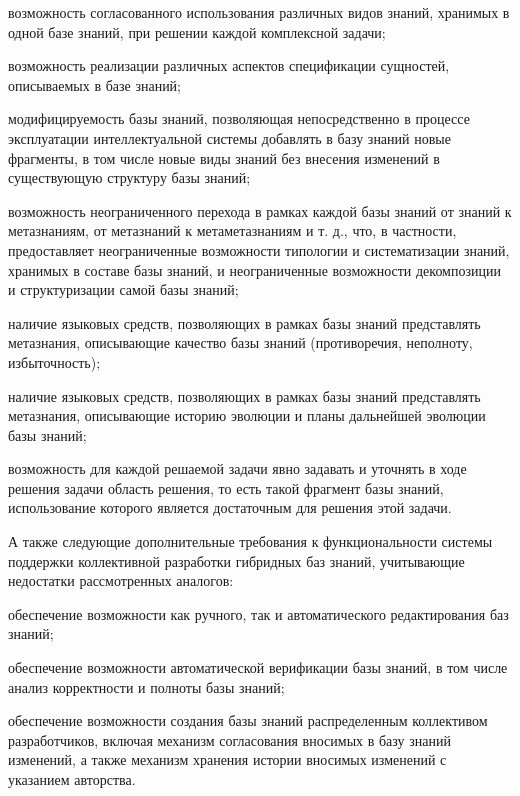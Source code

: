\begin{textitemize}
\item возможность согласованного использования различных видов знаний, хранимых в одной базе знаний, при решении каждой комплексной задачи;

\item возможность реализации различных аспектов спецификации сущностей, описываемых в базе знаний;

\item модифицируемость базы знаний, позволяющая непосредственно в процессе эксплуатации интеллектуальной системы добавлять в базу знаний новые фрагменты, в том числе новые виды знаний без внесения изменений в существующую структуру базы знаний;

\item возможность неограниченного перехода в рамках каждой базы знаний от знаний к метазнаниям, от метазнаний к метаметазнаниям и т. д., что, в частности, предоставляет неограниченные возможности типологии и систематизации знаний, хранимых в составе базы знаний, и неограниченные возможности декомпозиции и структуризации самой базы знаний;

\item наличие языковых средств, позволяющих в рамках базы знаний представлять метазнания, описывающие качество базы знаний (противоречия, неполноту, избыточность);

\item наличие языковых средств, позволяющих в рамках базы знаний представлять метазнания, описывающие историю эволюции и планы дальнейшей эволюции базы знаний;

\item возможность для каждой решаемой задачи явно задавать и уточнять в ходе решения задачи область решения, то есть такой фрагмент базы знаний, использование которого является достаточным для решения этой задачи.
\end{textitemize}

А также следующие дополнительные требования к функциональности системы поддержки коллективной разработки гибридных баз знаний, учитывающие недостатки рассмотренных аналогов:

\begin{textitemize}
\item обеспечение возможности как ручного, так и автоматического редактирования баз знаний;

\item обеспечение возможности автоматической верификации базы знаний, в том числе анализ корректности и полноты базы знаний;

\item обеспечение возможности создания базы знаний распределенным коллективом разработчиков, включая механизм согласования вносимых в базу знаний изменений, а также механизм хранения истории вносимых изменений с указанием авторства.
\end{textitemize}

